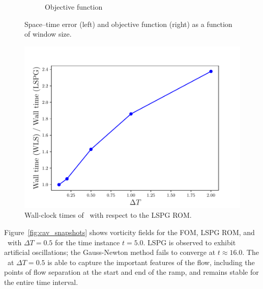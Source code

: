 \begin{figure}
\begin{center}
\begin{subfigure}[t]{0.45\textwidth}
\caption{Objective function} 
\label{fig:cav_results2b}
\end{subfigure}
\end{center}
\caption{Space--time error (left) and objective function (right) as a function of window size.}
\label{fig:cav_results2}
\end{figure}


\begin{figure}
\begin{center}
\includegraphics[trim={0cm 0cm 0cm 0cm},clip,width=0.49\linewidth]{figs/cavity/walltime_vs_window_compare_basis2.pdf}
\caption{Wall-clock times of \methodAcronymROMs\ with respect to the LSPG ROM.}
\label{fig:cav_wallclock}
\end{center}
\end{figure}

Figure~\ref{fig:cav_snapshots} shows vorticity fields for the FOM, LSPG ROM, and \methodAcronymROM\ with $\Delta T = 0.5$ for the time instance $t = 5.0$. LSPG is observed to exhibit artificial oscillations; the Gauss-Newton method fails to converge at $t \approx 16.0$. The \methodAcronymROM\ at $\Delta T = 0.5$ is able to capture the important features of the flow, including the points of flow separation at the start and end of the ramp, and remains stable for the entire time interval.  

